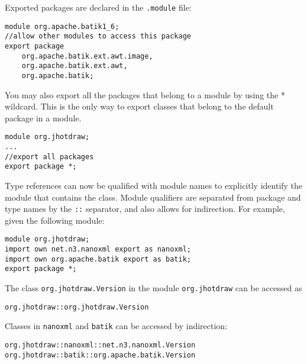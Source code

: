 Exported packages are declared in the {\tt .module} file:

\begin{lstlisting}
module org.apache.batik1_6;
//allow other modules to access this package
export package 
	org.apache.batik.ext.awt.image,
	org.apache.batik.ext.awt,
	org.apache.batik;
\end{lstlisting}

You may also export all the packages that belong to a module by using
the * wildcard. This is the only way to export classes that belong to
the default package in a module.

\begin{lstlisting}
module org.jhotdraw;
...
//export all packages
export package *;
\end{lstlisting}




Type references can now be qualified with module names to explicitly
identify the module that contains the class. Module qualifiers
are separated from package and type names by the \texttt{::} separator,
and also allows for indirection. For example, given the following module:

\begin{lstlisting}
module org.jhotdraw;
import own net.n3.nanoxml export as nanoxml;
import own org.apache.batik export as batik;
export package *;
\end{lstlisting}

The class \texttt{org.jhotdraw.Version} in the module \texttt{org.jhotdraw}
can be accessed as
\begin{lstlisting}
org.jhotdraw::org.jhotdraw.Version
\end{lstlisting}
Classes in \texttt{nanoxml} and \texttt{batik} can be accessed by indirection:
\begin{lstlisting}
org.jhotdraw::nanoxml::net.n3.nanoxml.Version
org.jhotdraw::batik::org.apache.batik.Version
\end{lstlisting}

